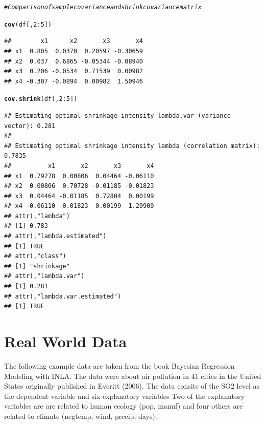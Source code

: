 \documentclass[11pt,a4paper,twoside]{book}
\makeatletter
\newcommand{\hlnum}[1]{\textcolor[rgb]{0.686,0.059,0.569}{#1}}%
\newcommand{\hlcom}[1]{\textcolor[rgb]{0.678,0.584,0.686}{\textit{#1}}}%
\newcommand{\hlopt}[1]{\textcolor[rgb]{0,0,0}{#1}}%
\newcommand{\hlstd}[1]{\textcolor[rgb]{0.345,0.345,0.345}{#1}}%
\newcommand{\hlkwd}[1]{\textcolor[rgb]{0.737,0.353,0.396}{\textbf{#1}}}%
\newenvironment{kframe}{%
 \def\at@end@of@kframe{}%
 \ifinner\ifhmode%
  \def\at@end@of@kframe{\end{minipage}}%
  \begin{minipage}{\columnwidth}%
 \fi\fi%
 \def\FrameCommand##1{\hskip\@totalleftmargin \hskip-\fboxsep
 \colorbox{shadecolor}{##1}\hskip-\fboxsep
     \hskip-\linewidth \hskip-\@totalleftmargin \hskip\columnwidth}%
 \MakeFramed {\advance\hsize-\width
   \@totalleftmargin\z@ \linewidth\hsize
   \@setminipage}}%
 {\par\unskip\endMakeFramed%
 \at@end@of@kframe}
\newenvironment{knitrout}{}{} %
\makeatother
\begin{document}
\begin{knitrout}
\color{fgcolor}\begin{kframe}
\begin{alltt}
\hlcom{#Comparison of sample covariance and shrink covariance matrix}

\hlkwd{cov}\hlstd{(df[,}\hlnum{2}\hlopt{:}\hlnum{5}\hlstd{])}
\end{alltt}
\begin{verbatim}
##        x1      x2       x3       x4
## x1  0.805  0.0370  0.20597 -0.30659
## x2  0.037  0.6865 -0.05344 -0.08940
## x3  0.206 -0.0534  0.71539  0.00982
## x4 -0.307 -0.0894  0.00982  1.50946
\end{verbatim}
\begin{alltt}
\hlkwd{cov.shrink}\hlstd{(df[,}\hlnum{2}\hlopt{:}\hlnum{5}\hlstd{])}
\end{alltt}
\begin{verbatim}
## Estimating optimal shrinkage intensity lambda.var (variance vector): 0.281 
## 
## Estimating optimal shrinkage intensity lambda (correlation matrix): 0.7835
##          x1       x2       x3       x4
## x1  0.79278  0.00806  0.04464 -0.06110
## x2  0.00806  0.70728 -0.01185 -0.01823
## x3  0.04464 -0.01185  0.72804  0.00199
## x4 -0.06110 -0.01823  0.00199  1.29900
## attr(,"lambda")
## [1] 0.783
## attr(,"lambda.estimated")
## [1] TRUE
## attr(,"class")
## [1] "shrinkage"
## attr(,"lambda.var")
## [1] 0.281
## attr(,"lambda.var.estimated")
## [1] TRUE
\end{verbatim}
\end{kframe}
\end{knitrout}

\section{Real World Data}


The following example data are taken from the book Bayesian Regression Modeling with INLA. The data were about air pollution in 41 cities in the United States originally published in Everitt (2006). The data consits of the SO2 level as the dependent variable and six explanatory variables 
Two of the explanatory variables are are related to human ecology (pop, manuf) and four others are related to climate (negtemp, wind, precip, days).
\end{document}
